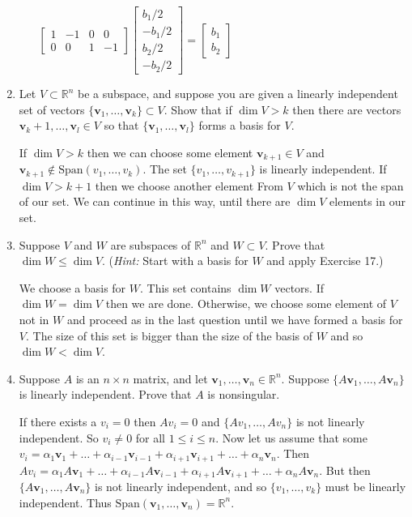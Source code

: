 \documentclass[letterpaper]{article}
\newcommand{\Span}{\text{Span}}
\begin{document}
\begin{enumerate}
\begin{enumerate}
  $\left[\begin{array}{rrrr}1&-1&0&0\\0&0&1&-1\end{array}\right]\left[\begin{array}{r}b_1/2\\-b_1/2\\b_2/2\\-b_2/2\end{array}\right]=\left[\begin{array}{r}b_1\\b_2\end{array}\right]$
  \end{enumerate}
\setcounter{enumi}{16}
\item
Let $V\subset \mathbb{R}^n$ be a subspace, and suppose you are given a linearly independent set of vectors $\{\mathbf{v}_1,\dots,\mathbf{v}_k\}\subset V$. Show that if $\dim V>k$ then there are vectors $\mathbf{v}_k+1,\dots,\mathbf{v}_l\in V$ so that $\{\mathbf{v}_1,\dots,\mathbf{v}_l\}$ forms a basis for $V$.

If $\dim V>k$ then we can choose some element $\mathbf{v}_{k+1}\in V$ and $\mathbf{v}_{k+1}\not\in \Span\left(v_1,\dots,v_k\right)$. The set $\{v_1,\dots,v_{k+1}\}$ is linearly independent. If $\dim V>k+1$ then we choose another element From $V$ which is not the span of our set. We can continue in this way, until there are $\dim V$ elements in our set. 
\item
Suppose $V$ and $W$ are subspaces of $\mathbb{R}^n$ and $W\subset V$. Prove that $\dim W\le \dim V$. (\emph{Hint:} Start with a basis for $W$ and apply Exercise 17.)

We choose a basis for $W$. This set contains $\dim W$ vectors. If $\dim W=\dim V$ then we are done. Otherwise, we choose some element of $V$ not in $W$ and proceed as in the last question until we have formed a basis for $V$. The size of this set is bigger than the size of the basis of $W$ and so $\dim W<\dim V$.
\item
Suppose $A$ is an $n\times n$ matrix, and let $\mathbf{v}_1,\dots,\mathbf{v}_n\in \mathbb{R}^n$. Suppose $\{A\mathbf{v}_1,\dots,A\mathbf{v}_n\}$ is linearly independent. Prove that $A$ is nonsingular.

If there exists a $v_i=0$ then $Av_i=0$ and $\{Av_1,\dots,Av_n\}$ is not linearly independent. So $v_i\ne 0$ for all $1\le i\le n$. Now let us assume that some $v_i=\alpha_1\mathbf{v}_1+\dots+\alpha_{i-1}\mathbf{v}_{i-1}+\alpha_{i+1}\mathbf{v}_{i+1}+\dots+\alpha_n\mathbf{v}_{n}$. Then $Av_i=\alpha_1A\mathbf{v}_1+\dots+\alpha_{i-1}A\mathbf{v}_{i-1}+\alpha_{i+1}A\mathbf{v}_{i+1}+\dots+\alpha_nA\mathbf{v}_{n}$. But then $\{A\mathbf{v}_1,\dots,A\mathbf{v}_n\}$ is not linearly independent, and so $\{v_1,\dots,v_k\}$ must be linearly independent. Thus $\Span(\mathbf{v}_1,\dots,\mathbf{v}_n)=\mathbb{R}^n$.


\end{enumerate}
\end{document}

